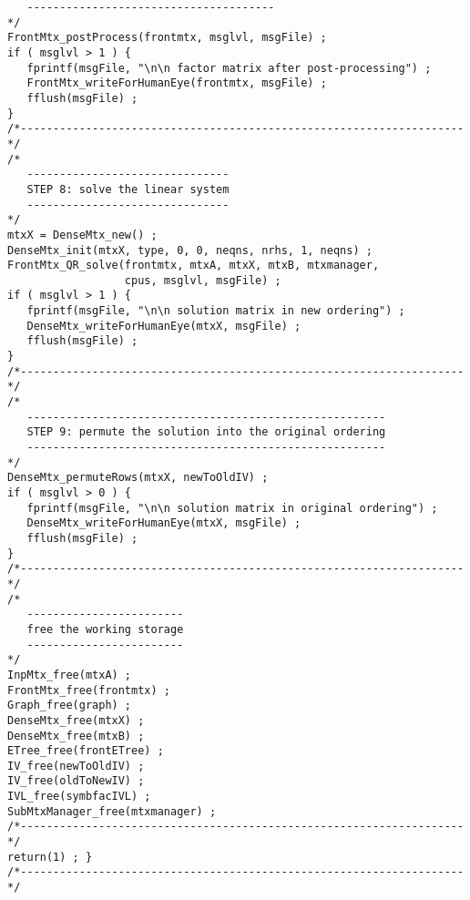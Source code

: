 \begin{verbatim}
   --------------------------------------
*/
FrontMtx_postProcess(frontmtx, msglvl, msgFile) ;
if ( msglvl > 1 ) {
   fprintf(msgFile, "\n\n factor matrix after post-processing") ;
   FrontMtx_writeForHumanEye(frontmtx, msgFile) ;
   fflush(msgFile) ;
}
/*--------------------------------------------------------------------*/
/*
   -------------------------------
   STEP 8: solve the linear system
   -------------------------------
*/
mtxX = DenseMtx_new() ;
DenseMtx_init(mtxX, type, 0, 0, neqns, nrhs, 1, neqns) ;
FrontMtx_QR_solve(frontmtx, mtxA, mtxX, mtxB, mtxmanager,
                  cpus, msglvl, msgFile) ;
if ( msglvl > 1 ) {
   fprintf(msgFile, "\n\n solution matrix in new ordering") ;
   DenseMtx_writeForHumanEye(mtxX, msgFile) ;
   fflush(msgFile) ;
}
/*--------------------------------------------------------------------*/
/*
   -------------------------------------------------------
   STEP 9: permute the solution into the original ordering
   -------------------------------------------------------
*/
DenseMtx_permuteRows(mtxX, newToOldIV) ;
if ( msglvl > 0 ) {
   fprintf(msgFile, "\n\n solution matrix in original ordering") ;
   DenseMtx_writeForHumanEye(mtxX, msgFile) ;
   fflush(msgFile) ;
}
/*--------------------------------------------------------------------*/
/*
   ------------------------
   free the working storage
   ------------------------
*/
InpMtx_free(mtxA) ;
FrontMtx_free(frontmtx) ;
Graph_free(graph) ;
DenseMtx_free(mtxX) ;
DenseMtx_free(mtxB) ;
ETree_free(frontETree) ;
IV_free(newToOldIV) ;
IV_free(oldToNewIV) ;
IVL_free(symbfacIVL) ;
SubMtxManager_free(mtxmanager) ;
/*--------------------------------------------------------------------*/
return(1) ; }
/*--------------------------------------------------------------------*/
\end{verbatim}
